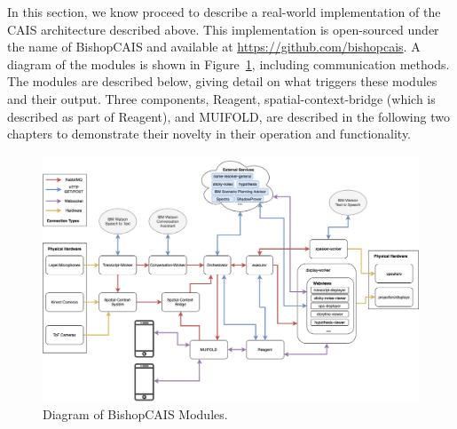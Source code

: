 
In this section, we know proceed to describe a real-world implementation of the
CAIS architecture described above. This implementation is open-sourced under the
name of BishopCAIS and available at \url{https://github.com/bishopcais}. A diagram
of the modules is shown in Figure~\ref{fig:cais_implementation}, including
communication methods. The modules are described below, giving detail on what
triggers these modules and their output. Three components, Reagent, 
spatial-context-bridge (which is described as part of Reagent), and MUIFOLD, are
described in the following two chapters to demonstrate their novelty in their
operation and functionality.


\begin{figure}
    \centering
    \includegraphics[width=1\columnwidth]{chapters/02_technology/figures/cais_implementation_full.png}
    \caption{Diagram of BishopCAIS Modules.}
    \label{fig:cais_implementation}
\end{figure}
